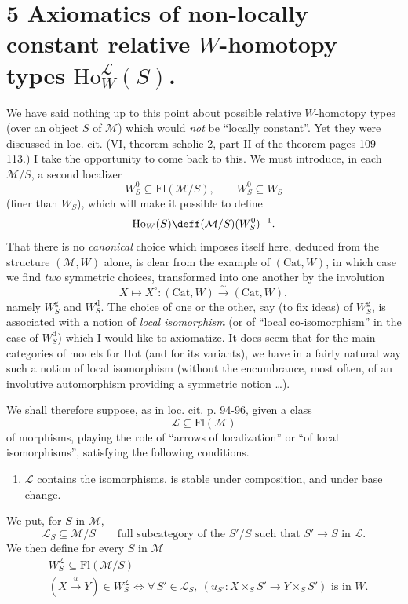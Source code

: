 
\section*{5 Axiomatics of non-locally constant relative $W$-homotopy types $\mathrm{Ho}^{\mathcal{L}}_W(S)$.}

We have said nothing up to this point about possible relative $W$-homotopy types (over an object $S$ of $\mathcal{M}$) which would \textit{not} be ``locally constant''. Yet they were discussed in loc. cit. (VI, theorem-scholie 2, part II of the theorem pages 109-113.) I take the opportunity to come back to this. We must introduce, in each $\mathcal{M}/S$, a second localizer
\[
W^0_S \subseteq \mathrm{Fl}(\mathcal{M}/S), \qquad W^0_S \subseteq W_S
\]
(finer than $W_S$), which will make it possible to define
\[
\mathrm{Ho}_W(S) \deff (\mathcal{M}/S)(W^0_S)^{-1}.
\]
That there is no \textit{canonical} choice which imposes itself here, deduced from the structure $(\mathcal{M},W)$ alone, is clear from the example of $(\mathrm{Cat},W)$, in which case we find \textit{two} symmetric choices, transformed into one another by the involution
\[
X \longmapsto X^\circ : (\mathrm{Cat},W) \xrightarrow{\sim} (\mathrm{Cat},W),
\]
namely $W^{\mathrm{g}}_S$ and $W^{\mathrm{d}}_S$. The choice of one or the other, say (to fix ideas) of $W^{\mathrm{g}}_S$, is associated with a notion of \textit{local isomorphism} (or of ``local co-isomorphism'' in the case of $W^{\mathrm{d}}_S$) which I would like to axiomatize. It does seem that for the main categories of models for Hot (and for its variants), we have in a fairly natural way such a notion of local isomorphism (without the encumbrance, most often, of an involutive automorphism providing a symmetric notion \dots).

We shall therefore suppose, as in loc. cit. p. 94-96, given a class
\[
\mathcal{L} \subseteq \mathrm{Fl}(\mathcal{M})
\]
of morphisms, playing the role of ``arrows of %
localization'' or ``of local isomorphisms'', satisfying the following conditions.

\begin{enumerate}
\item[$(*)$] $\mathcal{L}$ contains the isomorphisms, is stable under composition, and under base change.
\end{enumerate}

We put, for $S$ in $\mathcal{M}$,
\[
\mathcal{L}_S \subseteq \mathcal{M}/S \qquad \text{full subcategory of the } S'/S \text{ such that } S' \longrightarrow S \text{ in } \mathcal{L}.
\]
We then define for every $S$ in $\mathcal{M}$
\[
\begin{aligned}
&W^{\mathcal{L}}_S \subseteq \mathrm{Fl}(\mathcal{M}/S)\\
&(X \xrightarrow{u} Y) \in W^{\mathcal{L}}_S \iff \forall\, S' \in \mathcal{L}_S,\ (u_{S'} : X \times_S S' \longrightarrow Y \times_S S') \text{ is in } W.
\end{aligned}
\]

